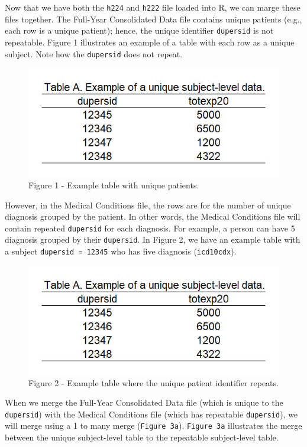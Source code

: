 \documentclass[
]{book}
\begin{document}
Now that we have both the \texttt{h224} and \texttt{h222} file loaded into R, we can marge these files together. The Full-Year Consolidated Data file contains unique patients (e.g., each row is a unique patient); hence, the unique identifier \texttt{dupersid} is not repeatable. Figure 1 illustrates an example of a table with each row as a unique subject. Note how the \texttt{dupersid} does not repeat.

\begin{figure}
\includegraphics[width=0.8\linewidth]{Figure 2_1} \caption{Figure 1 - Example table with unique patients.}\label{fig:unnamed-chunk-9}
\end{figure}

However, in the Medical Conditions file, the rows are for the number of unique diagnosis grouped by the patient. In other words, the Medical Conditions file will contain repeated \texttt{dupersid} for each diagnosis. For example, a person can have 5 diagnosis grouped by their \texttt{dupersid}. In Figure 2, we have an example table with a subject \texttt{dupersid\ =\ 12345} who has five diagnosis (\texttt{icd10cdx}).

\begin{figure}
\includegraphics[width=1\linewidth]{Figure 2_1} \caption{Figure 2 - Example table where the unique patient identifier repeats.}\label{fig:unnamed-chunk-10}
\end{figure}

When we merge the Full-Year Consolidated Data file (which is unique to the \texttt{dupersid}) with the Medical Conditions file (which has repeatable \texttt{dupersid}), we will merge using a 1 to many merge (\texttt{Figure\ 3a}). \texttt{Figure\ 3a} illustrates the merge between the unique subject-level table to the repeatable subject-level table.
\end{document}
